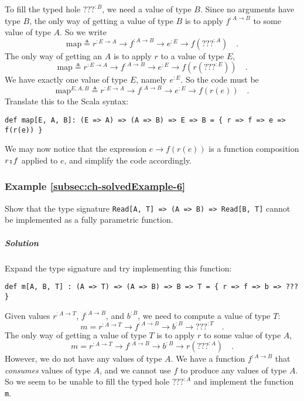 To fill the typed hole $\text{???}^{:B}$, we need a value of type
$B$. Since no arguments have type $B$, the only way of getting a
value of type $B$ is to apply $f^{:A\rightarrow B}$ to some value
of type $A$. So we write
\[
\text{map}\triangleq r^{:E\rightarrow A}\rightarrow f^{:A\rightarrow B}\rightarrow e^{:E}\rightarrow f(???^{:A})\quad.
\]
The only way of getting an $A$ is to apply $r$ to a value of type
$E$,
\[
\text{map}\triangleq r^{:E\rightarrow A}\rightarrow f^{:A\rightarrow B}\rightarrow e^{:E}\rightarrow f(r(???^{:E}))\quad.
\]
We have exactly one value of type $E$, namely $e^{:E}$. So the code
must be 
\[
\text{map}^{E,A,B}\triangleq r^{:E\rightarrow A}\rightarrow f^{:A\rightarrow B}\rightarrow e^{:E}\rightarrow f(r(e))\quad.
\]
Translate this to the Scala syntax:
\begin{lstlisting}
def map[E, A, B]: (E => A) => (A => B) => E => B = { r => f => e => f(r(e)) }
\end{lstlisting}
We may now notice that the expression $e\rightarrow f(r(e))$ is a
function composition $r\bef f$ applied to $e$, and simplify the
code accordingly.

\subsubsection{Example \label{subsec:ch-solvedExample-6}\ref{subsec:ch-solvedExample-6}}

Show that the type signature \lstinline!Read[A, T] => (A => B) => Read[B, T]!
cannot be implemented as a fully parametric function.

\subparagraph{Solution}

Expand the type signature and try implementing this function:
\begin{lstlisting}
def m[A, B, T] : (A => T) => (A => B) => B => T = { r => f => b => ??? }
\end{lstlisting}
Given values $r^{:A\rightarrow T}$, $f^{:A\rightarrow B}$, and $b^{:B}$,
we need to compute a value of type $T$:
\[
m=r^{:A\rightarrow T}\rightarrow f^{:A\rightarrow B}\rightarrow b^{:B}\rightarrow???^{:T}\quad.
\]
The only way of getting a value of type $T$ is to apply $r$ to some
value of type $A$,
\[
m=r^{:A\rightarrow T}\rightarrow f^{:A\rightarrow B}\rightarrow b^{:B}\rightarrow r(???^{:A})\quad.
\]
However, we do not have any values of type $A$. We have a function
$f^{:A\rightarrow B}$ that \emph{consumes} values of type $A$, and
we cannot use $f$ to produce any values of type $A$. So we seem
to be unable to fill the typed hole $\text{???}^{:A}$ and implement
the function \lstinline!m!.


